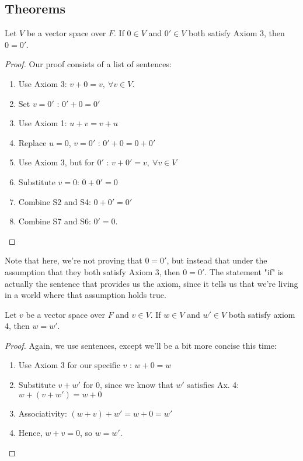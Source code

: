 \subsection{Theorems}
\begin{theorem}
	Let \( V \) be a vector space over \( F \). If \( 0 \in V \) and \( 0' \in V \) both satisfy Axiom 3, then 
	\( 0 = 0' \). 
\end{theorem}
\begin{proof}
	Our proof consists of a list of sentences: 
	\begin{enumerate}[label=S\arabic*)]
		\item Use Axiom 3: \( v + 0 = v, \ \forall v \in V\).
		\item Set \( v = 0' \) : \( 0' + 0 = 0' \) 
		\item Use Axiom 1: \( u + v = v+ u \) 
		\item Replace \( u = 0 \), \( v = 0' \) : \( 0' + 0 = 0 + 0' \)
		\item Use Axiom 3, but for \( 0' \) : \( v + 0' = v, \  \forall v \in V \)
		\item Substitute \( v = 0 \): \( 0 + 0' = 0 \) 
		\item Combine S2 and S4: \( 0 + 0' = 0' \)
		\item Combine S7 and S6: \( 0' = 0 \). 
	\end{enumerate}
\end{proof}
Note that here, we're not proving that \( 0 = 0' \), but instead that under the assumption that they both satisfy 
Axiom 3, then  \( 0 = 0' \). The statement "if" is actually the sentence that provides us the axiom, since it tells us 
that we're living in a world where that assumption holds true. 
\begin{theorem}
	Let \( v \) be a vector space over \( F \) and \( v \in V \). If \( w \in V \) and \( w' \in V \) both satisfy 
	axiom 4, then \( w = w' \). 
\end{theorem}
\begin{proof}
	Again, we use sentences, except we'll be a bit more concise this time:
	\begin{enumerate}[label=S\arabic*)]
		\item Use Axiom 3 for our specific \( v \) :  \( w + 0 = w \) 
		\item Substitute \( v + w' \) for \( 0 \), since we know that \( w' \) satisfies Ax. 4:
			\( w + (v + w') = w + 0\) 
		\item Associativity: \( (w + v) + w' = w + 0 = w'\) 
		\item Hence, \( w + v = 0 \), so \( w = w' \).
	\end{enumerate}
\end{proof}
 

